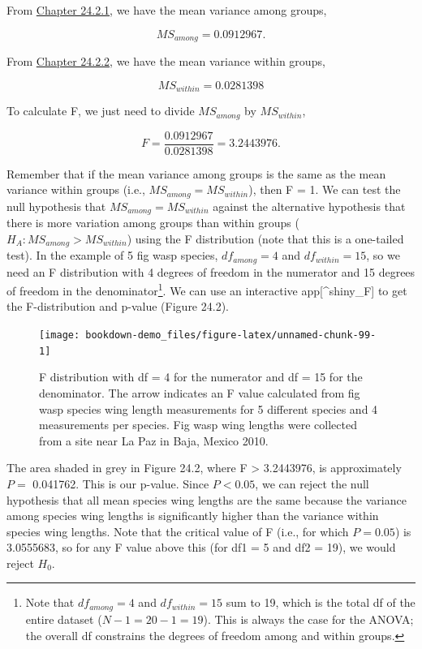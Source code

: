 \documentclass[
  openany]{scrbook}
\begin{document}
From \protect\hyperlink{anova-mean-variance-among-groups}{Chapter 24.2.1}, we have the mean variance among groups,

\[MS_{among} = 0.0912967.\]

From \protect\hyperlink{anova-mean-variance-among-groups}{Chapter 24.2.2}, we have the mean variance within groups,

\[MS_{within} = 0.0281398\]

To calculate F, we just need to divide \(MS_{among}\) by \(MS_{within}\),

\[F = \frac{0.0912967}{0.0281398} = 3.2443976.\]

Remember that if the mean variance among groups is the same as the mean variance within groups (i.e., \(MS_{among} = MS_{within}\)), then F = 1.
We can test the null hypothesis that \(MS_{among} = MS_{within}\) against the alternative hypothesis that there is more variation among groups than within groups (\(H_{A}: MS_{among} > MS_{within}\)) using the F distribution (note that this is a one-tailed test).
In the example of 5 fig wasp species, \(df_{among} = 4\) and \(df_{within} = 15\),
so we need an F distribution with 4 degrees of freedom in the numerator and 15 degrees of freedom in the denominator\footnote{Note that \(df_{among} = 4\) and \(df_{within} = 15\) sum to 19, which is the total df of the entire dataset (\(N - 1 = 20 - 1 = 19\)). This is always the case for the ANOVA; the overall df constrains the degrees of freedom among and within groups.}.
We can use an interactive app{[}\^{}shiny\_F{]} to get the F-distribution and p-value (Figure 24.2).

\begin{figure}
\texttt{[image: bookdown-demo\_files/figure-latex/unnamed-chunk-99-1]} \caption{F distribution with df = 4 for the numerator and df = 15 for the denominator. The arrow indicates an F value calculated from fig wasp species wing length measurements for 5 different species and 4 measurements per species. Fig wasp wing lengths were collected from a site near La Paz in Baja, Mexico 2010.}\label{fig:unnamed-chunk-99}
\end{figure}

The area shaded in grey in Figure 24.2, where F \textgreater{} 3.2443976, is approximately \(P =\) 0.041762.
This is our p-value.
Since \(P < 0.05\), we can reject the null hypothesis that all mean species wing lengths are the same because the variance among species wing lengths is significantly higher than the variance within species wing lengths.
Note that the critical value of F (i.e., for which \(P = 0.05\)) is 3.0555683, so for any F value above this (for df1 = 5 and df2 = 19), we would reject \(H_{0}\).
\end{document}
